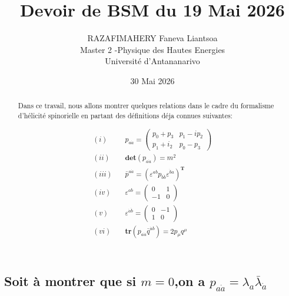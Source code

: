 \documentclass[12pt, a4paper]{article}
\title{Devoir de BSM du 19 Mai 2026}
\author{
	RAZAFIMAHERY Faneva Liantsoa\\
	\medskip %
	\normalsize Master 2 -Physique des Hautes Energies \\
	\medskip
	\normalsize Université d'Antananarivo  \\
}
\date{30 Mai 2026}
\begin{document}
	
	\maketitle
	\begin{abstract}
		Dans ce travail, nous allons montrer quelques relations dans le cadre du formalisme d'hélicité spinorielle en partant des définitions déja connues suivantes:
		
		\begin{equation}
			\begin{split}
				 (i)\quad &p_{a \dot{a}}=\begin{pmatrix}
					p_0 + p_3 & p_1-ip_2\\
					p_1 + i_2 & p_0 - p_3
				\end{pmatrix}\\
				 (ii)\quad&\mathbf{det} (p_{a \dot{a}})=m^2\\
				 (iii)\quad&\bar{p}^{a \dot{a}}=(\varepsilon^{ab} p_{b \dot{b}} \varepsilon^{\dot{b}\dot{a}})^{\mathbf{T}}\\
				 (iv)\quad& \varepsilon^{a b}=\begin{pmatrix}
					0 & 1\\
					-1 & 0
				\end{pmatrix}\\
				 (v)\quad& \varepsilon^{\dot{a}\dot{b}}=\begin{pmatrix}
					0 & -1\\
					1 & 0
				\end{pmatrix}\\
				(vi)\quad& \mathbf{tr}(p_{a \dot{a}}\bar{q}^{\dot{a} b})= 2p_{\mu}q^{\mu}
			\end{split}
		\end{equation}
		
	\end{abstract} 
	\section{}
		\subsection{Soit à montrer que si \(m=0\),\quad on a \(p_{a \dot{a}}=\lambda_a \bar{\lambda}_{\dot{a}}\)}
		
\end{document}
